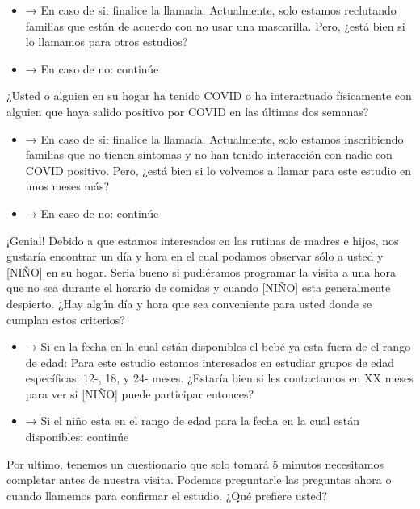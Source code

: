 \documentclass[
  12pt,
]{book}
\providecommand{\tightlist}{%
  \setlength{\itemsep}{0pt}\setlength{\parskip}{0pt}}
\begin{document}
\begin{itemize}
\tightlist
\item
  → En caso de si: finalice la llamada. Actualmente, solo estamos reclutando familias que están de acuerdo con no usar una mascarilla. Pero, ¿está bien si lo llamamos para otros estudios?
\item
  → En caso de no: continúe
\end{itemize}

¿Usted o alguien en su hogar ha tenido COVID o ha interactuado físicamente con alguien que haya salido positivo por COVID en las últimas dos semanas?

\begin{itemize}
\tightlist
\item
  → En caso de si: finalice la llamada. Actualmente, solo estamos inscribiendo familias que no tienen síntomas y no han tenido interacción con nadie con COVID positivo. Pero, ¿está bien si lo volvemos a llamar para este estudio en unos meses más?
\item
  → En caso de no: continúe
\end{itemize}

¡Genial! Debido a que estamos interesados en las rutinas de madres e hijos, nos gustaría encontrar un día y hora en el cual podamos observar sólo a usted y {[}NIÑO{]} en su hogar. Seria bueno si pudiéramos programar la visita a una hora que no sea durante el horario de comidas y cuando {[}NIÑO{]} esta generalmente despierto. ¿Hay algún día y hora que sea conveniente para usted donde se cumplan estos criterios?

\begin{itemize}
\tightlist
\item
  → Si en la fecha en la cual están disponibles el bebé ya esta fuera de el rango de edad: Para este estudio estamos interesados en estudiar grupos de edad específicas: 12-, 18, y 24- meses. ¿Estaría bien si les contactamos en XX meses para ver si {[}NIÑO{]} puede participar entonces?
\item
  → Si el niño esta en el rango de edad para la fecha en la cual están disponibles: continúe
\end{itemize}

Por ultimo, tenemos un cuestionario que solo tomará 5 minutos necesitamos completar antes de nuestra visita. Podemos preguntarle las preguntas ahora o cuando llamemos para confirmar el estudio. ¿Qué prefiere usted?
\end{document}
